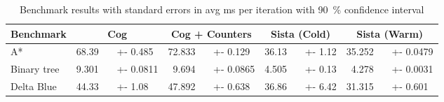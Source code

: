 \documentclass[preprint]{sigplanconf}
\begin{document}
\begin{table*}
  \caption{Benchmark results with standard errors in avg ms per iteration with \SI{90}{\percent} confidence interval}
  \centering
  \begin{tabular}{@{}lr@{}lr@{}lr@{}lr@{}l@{}}
    \toprule
    Benchmark & \multicolumn{2}{c}{Cog} & \multicolumn{2}{c}{Cog + Counters} & \multicolumn{2}{c}{Sista (Cold)} & \multicolumn{2}{c}{Sista (Warm)} \\
    \midrule
A* & 68.39  ~ & +- 0.485 & 72.833  ~ & +- 0.129 & 36.13  ~ & +- 1.12 & 35.252  ~ & +- 0.0479 \\
Binary tree & 9.301  ~ & +- 0.0811 & 9.694  ~ & +- 0.0865 & 4.505  ~ & +- 0.13 & 4.278  ~ & +- 0.0031 \\
Delta Blue & 44.33  ~ & +- 1.08 & 47.892  ~ & +- 0.638 & 36.86  ~ & +- 6.42 & 31.315  ~ & +- 0.601 \\

\end{tabular}
\end{table*}
\end{document}
